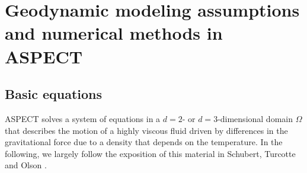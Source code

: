 \documentclass{article}
\newcommand{\aspect}{\textsc{ASPECT}}
\begin{document}
\section{Geodynamic modeling assumptions and numerical methods in \aspect{}}
\label{sec:models}

\subsection{Basic equations}
\label{sec:equations}

\aspect{} solves a system of equations in a $d=2$- or $d=3$-dimensional
domain $\Omega$ that describes the motion of a highly viscous fluid driven
by differences in the gravitational force due to a density that depends on
the temperature. In the following, we largely follow the exposition of this
material in Schubert, Turcotte and Olson \cite{STO01}.
\end{document}
